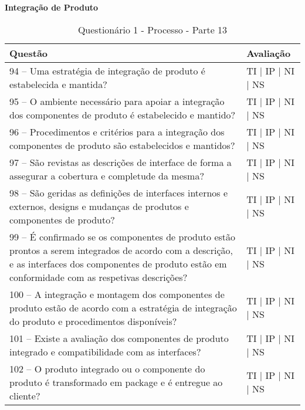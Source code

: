 \documentclass[openany,10pt,a4paper]{article}
\begin{document}
\begin{longtable}
\begin{appendix}
\begin{table}[h]
\textbf{Integração de Produto}
	\centering
	\caption{Questionário 1 - Processo - Parte 13}
	\begin{tabular}{p{3.5in}p{2in}}		
		\toprule
		\textbf{Questão}  & \textbf{Avaliação}\\ 
		\midrule
		94 – Uma estratégia de integração de produto é estabelecida e mantida?
 & TI | IP | NI | NS \\
        \midrule
		95 – O ambiente necessário para apoiar a integração dos componentes de produto é 
estabelecido e mantido?
 & TI | IP | NI | NS \\
		\midrule
		96 – Procedimentos e critérios para a integração dos componentes de produto são estabelecidos 
e mantidos?
 & TI | IP | NI | NS \\
		\midrule
        97 – São revistas as descrições de interface de forma a assegurar a cobertura e completude da 
mesma?
 & TI | IP | NI | NS \\
		\midrule
		98 – São geridas as definições de interfaces internos e externos, designs e mudanças de produtos 
e componentes de produto?
  & TI | IP | NI | NS \\
		\midrule
		99 – É confirmado se os componentes de produto estão prontos a serem integrados de acordo 
com a descrição, e as interfaces dos componentes de produto estão em conformidade com as
respetivas descrições? 
 & TI | IP | NI | NS \\
 \midrule
		100 – A integração e montagem dos componentes de produto estão de acordo com a estratégia
de integração do produto e procedimentos disponíveis? 
 & TI | IP | NI | NS \\
 \midrule
		101 – Existe a avaliação dos componentes de produto integrado e compatibilidade com as
interfaces? 
 & TI | IP | NI | NS \\
 \midrule
		102 – O produto integrado ou o componente do produto é transformado em package e é
entregue ao cliente? 
 & TI | IP | NI | NS \\
		\bottomrule
	\end{tabular} 
	\label{tab:tabela1}
\end{table}


\end{appendix}
\end{longtable}
\end{document}
